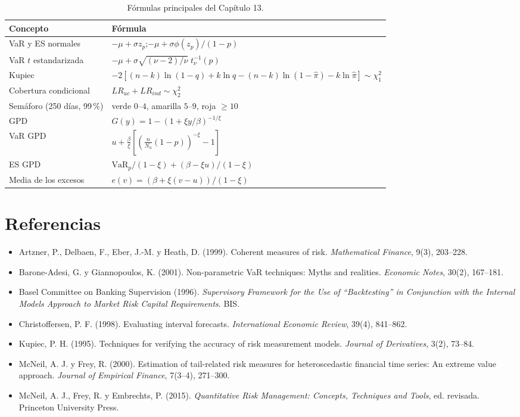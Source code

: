\begin{table}[H]
\centering\small
\begin{tabular}{@{}ll@{}}
\toprule
Concepto & Fórmula \\
\midrule
VaR y ES normales & $-\mu+\sigma z_p$;\quad $-\mu+\sigma\phi(z_p)/(1-p)$ \\
VaR $t$ estandarizada & $-\mu+\sigma\sqrt{(\nu-2)/\nu}\;t_\nu^{-1}(p)$ \\
Kupiec & $-2[(n-k)\ln(1-q)+k\ln q-(n-k)\ln(1-\hat\pi)-k\ln\hat\pi]\sim\chi^2_1$ \\
Cobertura condicional & $LR_{uc}+LR_{ind}\sim\chi^2_2$ \\
Semáforo (250 días, 99\,\%) & verde $0$--$4$, amarilla $5$--$9$, roja $\ge10$ \\
GPD & $G(y)=1-(1+\xi y/\beta)^{-1/\xi}$ \\
VaR GPD & $u+\frac\beta\xi[(\frac{n}{N_u}(1-p))^{-\xi}-1]$ \\
ES GPD & $\mathrm{VaR}_p/(1-\xi)+(\beta-\xi u)/(1-\xi)$ \\
Media de los excesos & $e(v)=(\beta+\xi(v-u))/(1-\xi)$ \\
\bottomrule
\end{tabular}
\caption{Fórmulas principales del Capítulo 13.}
\end{table}

\section*{Referencias}
\begin{itemize}[leftmargin=*]
  \item Artzner, P., Delbaen, F., Eber, J.-M. y Heath, D. (1999). Coherent measures of risk. \emph{Mathematical
        Finance}, 9(3), 203--228.
  \item Barone-Adesi, G. y Giannopoulos, K. (2001). Non-parametric VaR techniques: Myths and realities.
        \emph{Economic Notes}, 30(2), 167--181.
  \item Basel Committee on Banking Supervision (1996). \emph{Supervisory Framework for the Use of ``Backtesting'' in
        Conjunction with the Internal Models Approach to Market Risk Capital Requirements}. BIS.
  \item Christoffersen, P. F. (1998). Evaluating interval forecasts. \emph{International Economic Review}, 39(4),
        841--862.
  \item Kupiec, P. H. (1995). Techniques for verifying the accuracy of risk measurement models. \emph{Journal of
        Derivatives}, 3(2), 73--84.
  \item McNeil, A. J. y Frey, R. (2000). Estimation of tail-related risk measures for heteroscedastic financial time
        series: An extreme value approach. \emph{Journal of Empirical Finance}, 7(3--4), 271--300.
  \item McNeil, A. J., Frey, R. y Embrechts, P. (2015). \emph{Quantitative Risk Management: Concepts, Techniques and
        Tools}, ed. revisada. Princeton University Press.
\end{itemize}
